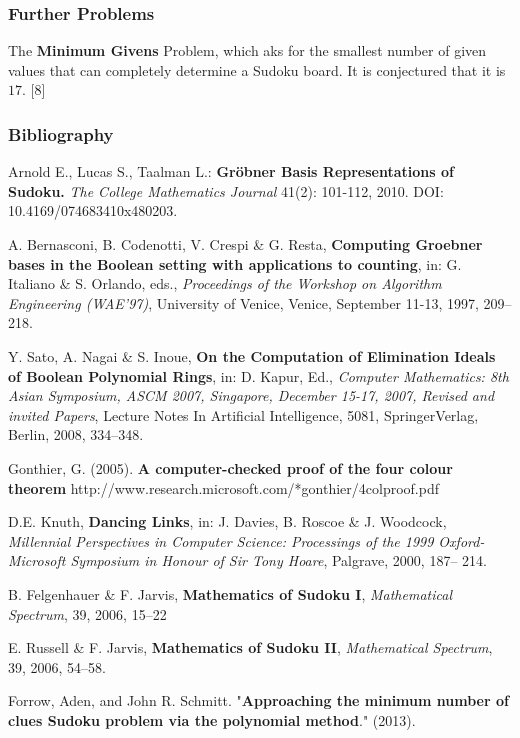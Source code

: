 \documentclass{beamer}
\begin{document}
\begin{frame}
\frametitle{Further Problems}
The \textbf{Minimum Givens} Problem, which aks for the smallest number of given values that can completely determine a Sudoku board. It is conjectured that it is $17$. [8]
\end{frame}


\begin{frame}
\frametitle{Bibliography}
\begin{itemize}
\scriptsize{\item [{[1]}] Arnold E., Lucas S., Taalman L.: \textbf{Gr\" obner Basis Representations of Sudoku.} \textit{The College Mathematics Journal} 41(2): 101-112, 2010. DOI:
10.4169/074683410x480203. 
\item [{[2]}] A. Bernasconi, B. Codenotti, V. Crespi \& G. Resta, \textbf{Computing Groebner bases in the Boolean setting with applications to counting}, in: G. Italiano \& S. Orlando, eds., \textit{Proceedings of the Workshop on Algorithm Engineering (WAE’97)}, University of Venice, Venice, September 11-13, 1997, 209–218.
\item [{[3]}] Y. Sato, A. Nagai \& S. Inoue, \textbf{On the Computation of Elimination Ideals of Boolean Polynomial Rings}, in: D. Kapur, Ed., \textit{Computer Mathematics: 8th Asian Symposium, ASCM 2007, Singapore, December 15-17, 2007, Revised and invited Papers}, Lecture Notes In Artificial Intelligence, 5081, SpringerVerlag, Berlin, 2008, 334–348.
\item[{[4]}] Gonthier, G. (2005). \textbf{A computer-checked proof of the four colour theorem} http://www.research.microsoft.com/*gonthier/4colproof.pdf
\item [{[5]}] D.E. Knuth, \textbf{Dancing Links}, in: J. Davies, B. Roscoe \& J. Woodcock, \textit{Millennial Perspectives in Computer Science: Processings of the 1999 Oxford-Microsoft Symposium in Honour of Sir Tony Hoare}, Palgrave, 2000, 187–
214.
\item [{[6]}]  B. Felgenhauer \& F. Jarvis, \textbf{Mathematics of Sudoku I}, \textit{Mathematical Spectrum}, 39, 2006, 15–22
\item [{[7]}] E. Russell \& F. Jarvis, \textbf{Mathematics of Sudoku II}, \textit{Mathematical Spectrum}, 39, 2006, 54–58.
\item [{[8]}] Forrow, Aden, and John R. Schmitt. "\textbf{Approaching the minimum number of clues Sudoku problem via the polynomial method}." (2013).
}\end{itemize}
\end{frame}
\end{document}
